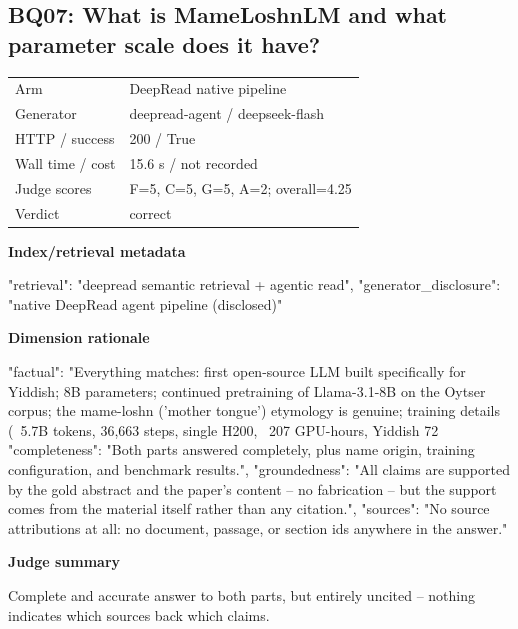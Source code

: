 \documentclass[10pt]{article}
\begin{document}
\subsection{BQ07: What is MameLoshnLM and what parameter scale does it have?}
\begin{tabular}{@{}ll@{}}
Arm & DeepRead native pipeline\\
Generator & deepread-agent / deepseek-flash\\
HTTP / success & 200 / True\\
Wall time / cost & 15.6 s / not recorded\\
Judge scores & F=5, C=5, G=5, A=2; overall=4.25\\
Verdict & correct\\
\end{tabular}

\textbf{Index/retrieval metadata}
\begin{EvidenceText}
{
  "retrieval": "deepread semantic retrieval + agentic read",
  "generator_disclosure": "native DeepRead agent pipeline (disclosed)"
}
\end{EvidenceText}

\textbf{Dimension rationale}
\begin{EvidenceText}
{
  "factual": "Everything matches: first open-source LLM built specifically for Yiddish; 8B parameters; continued pretraining of Llama-3.1-8B on the Oytser corpus; the mame-loshn ('mother tongue') etymology is genuine; training details (~5.7B tokens, 36,663 steps, single H200, ~207 GPU-hours, Yiddish 72%
  "completeness": "Both parts answered completely, plus name origin, training configuration, and benchmark results.",
  "groundedness": "All claims are supported by the gold abstract and the paper's content -- no fabrication -- but the support comes from the material itself rather than any citation.",
  "sources": "No source attributions at all: no document, passage, or section ids anywhere in the answer."
}
\end{EvidenceText}

\textbf{Judge summary}
\begin{EvidenceText}
Complete and accurate answer to both parts, but entirely uncited -- nothing indicates which sources back which claims.
\end{EvidenceText}
\end{document}
